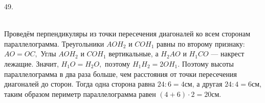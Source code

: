 49. \begin{figure}[ht!]
\end{figure}\\
Проведём перпендикуляры из точки пересечения диагоналей ко всем сторонам параллелограмма. Треугольники $AOH_2$ и $COH_1$ равны по второму признаку: $AO=OC,$ Углы $AOH_2$ и $COH_1$ вертикальные, а $H_2AO$ и $H_1CO$ --- накрест лежащие. Значит, $H_1O=H_2O,$ поэтому $H_1H_2=2OH_1.$ Поэтому высоты параллелограмма в два раза больше, чем расстояния от точки пересечения диагоналей до сторон. Тогда одна сторона равна $24:6=4$см, а другая $24:4=6$см, таким образом периметр параллелограмма равен $(4+6)\cdot2=20$см.\\
